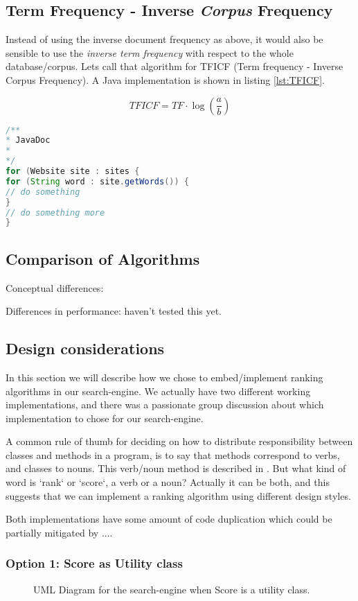 \subsection{Term Frequency - Inverse \emph{Corpus} Frequency}
Instead of using the inverse document frequency as above, it would also be sensible to use the \emph{inverse term frequency} with respect to the whole database/corpus. Lets call that algorithm for TFICF (Term frequency - Inverse Corpus Frequency). A Java implementation is shown in listing \ref{lst:TFICF}.
    
\[ TFICF = TF \cdot \log{\left( \frac{a}{b} \right) } \]


\begin{lstlisting}[language=Java, caption=This is a code example., label=lst:TFICF]
/**
* JavaDoc
*
*/
for (Website site : sites {
for (String word : site.getWords()) {
// do something	
}
// do something more
}
\end{lstlisting}




\subsection{Comparison of Algorithms}

Conceptual differences:


Differences in performance: haven't tested this yet.


\subsection{Design considerations}
In this section we will describe how we chose to embed/implement ranking algorithms in our search-engine. We actually have two different working implementations, and there was a passionate group discussion about which implementation to chose for our search-engine.  

A common rule of thumb for deciding on how to distribute responsibility between classes and methods in a program, is to say that methods correspond to verbs, and classes to nouns. This verb/noun method is described in \cite[p.530]{BK}.
But what kind of word is `rank` or `score`, a verb or a noun? Actually it can be both, and this suggests that we can implement a ranking algorithm using different design styles.

Both implementations have some amount of code duplication which could be partially mitigated by ....


\subsubsection{Option 1: Score as Utility class}
\begin{figure}[t]
	\centering
	\caption{UML Diagram for the search-engine when Score is a utility class.}
	\label{fig:uml:score-as-utility}
\end{figure}

